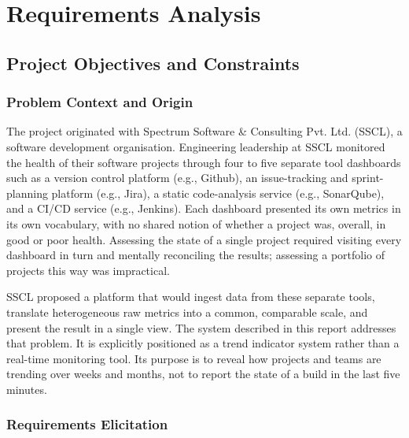 \chapter{Requirements Analysis}
\label{ch:requirements}

\section{Project Objectives and Constraints}
\label{sec:requirements}

\subsection{Problem Context and Origin}
\label{subsec:problem-context}

The project originated with Spectrum Software \& Consulting Pvt. Ltd. (SSCL), a software development organisation. Engineering leadership at
SSCL monitored the health of their software projects through four to five
separate tool dashboards such as a version control platform (e.g., Github), an issue-tracking and sprint-planning platform (e.g., Jira), a static code-analysis service (e.g., SonarQube), and a CI/CD service (e.g., Jenkins). Each dashboard presented its own metrics in its
own vocabulary, with no shared notion of whether a project was, overall, in good
or poor health. Assessing the state of a single project required visiting every
dashboard in turn and mentally reconciling the results; assessing a portfolio of
projects this way was impractical.

SSCL proposed a platform that would ingest data from these separate tools,
translate heterogeneous raw metrics into a common, comparable scale, and present
the result in a single view. The system described in this report addresses that
problem. It is explicitly positioned as a trend indicator system rather
than a real-time monitoring tool. Its purpose is to reveal how projects and teams
are trending over weeks and months, not to report the state of a build in the
last five minutes.

\subsection{Requirements Elicitation}
\label{subsec:elicitation}

